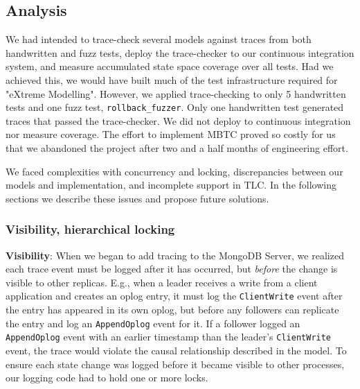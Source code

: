 \documentclass{vldb}
\begin{document}
\subsection{Analysis}
\label{subsec:mbtc_analysis}


We had intended to trace-check several models against traces from both handwritten and fuzz tests, deploy the trace-checker to our continuous integration system, and measure accumulated state space coverage over all tests. 
Had we achieved this, we would have built much of the test infrastructure required for "eXtreme Modelling".
However, we applied trace-checking to only 5 handwritten tests and one fuzz test, \texttt{rollback\_fuzzer}. 
Only one handwritten test generated traces that passed the trace-checker. 
We did not deploy to continuous integration nor measure coverage. 
The effort to implement MBTC proved so costly for us that we abandoned the project after two and a half months of engineering effort. 

We faced complexities with concurrency and locking, discrepancies between our models and implementation, and incomplete support in TLC. 
In the following sections we describe these issues and propose future solutions.

\subsubsection{Visibility, hierarchical locking}
\label{subsubsec:mbtc_locking}

\textbf{Visibility}: When we began to add tracing to the MongoDB Server, we realized each trace event must be logged after it has occurred, but \textit{before} the change is visible to other replicas. 
E.g., when a leader receives a write from a client application and creates an oplog entry, it must log the \texttt{ClientWrite} event after the entry has appeared in its own oplog, but before any followers can replicate the entry and log an \texttt{AppendOplog} event for it. 
If a follower logged an \texttt{AppendOplog} event with an earlier timestamp than the leader's \texttt{ClientWrite} event, the trace would violate the causal relationship described in the model. 
To ensure each state change was logged before it became visible to other processes, our logging code had to hold one or more locks.
\end{document}
